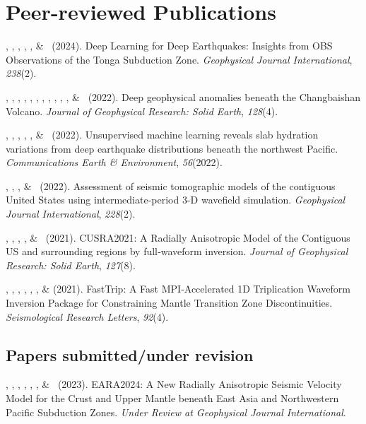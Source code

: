 \section{Peer-reviewed Publications}
\newcommand{\Revision}{\emph{under revision}}
\newcommand{\CS}{*} %
\newcommand{\CF}{\textsuperscript{\#}} %

\begin{etaremune}
\item \Me, \SWei, \WZhu, \GBeroza, \YJie, \& \NSaloor\ (2024).
    Deep Learning for Deep Earthquakes: Insights from OBS Observations of the Tonga Subduction Zone. 
    \emph{Geophysical Journal International}, \emph{238}(2). 
\item \SLi, \JLi, \TFerrand, \TZhou, \MLv, \Me, \RMaguire, \GHan, \JuanLi, \XBao, \YJiang, \& \TBao\ (2022).
    Deep geophysical anomalies beneath the Changbaishan Volcano.
    \emph{Journal of Geophysical Research: Solid Earth}, \emph{128}(4). 
\item \GMao, \TFerrand, \JLi, \BZhu, \Me, \& \MChen\ (2022).
Unsupervised machine learning reveals slab hydration variations from deep earthquake distributions beneath the northwest Pacific.
    \emph{Communications Earth \& Environment}, \emph{56}(2022). 
\item \TZhou, \Me, \JLi, \& \MChen\ (2022).
Assessment of seismic tomographic models of the contiguous United States using intermediate-period 3-D wavefield simulation.
    \emph{Geophysical Journal International}, \emph{228}(2). 
\item \TZhou, \JLi, \Me, \GLi, \& \MChen\ (2021).
CUSRA2021: A Radially Anisotropic Model of the Contiguous US and surrounding regions by full‐waveform inversion.
    \emph{Journal of Geophysical Research: Solid Earth}, \emph{127}(8). 
\item \JLi, \MChen, \KKoper, \TZhou, \Me, \SLi, \& \GLi (2021).
FastTrip: A Fast MPI‐Accelerated 1D Triplication Waveform Inversion Package for Constraining Mantle Transition Zone Discontinuities.
    \emph{Seismological Research Letters}, \emph{92}(4). 
\end{etaremune}

\subsection*{Papers submitted/under revision}
\begin{etaremune}
\item \Me, \MChen, \SWei, \JLi, \TZhou, \BWang, \& \YKim\ (2023).
    EARA2024: A New Radially Anisotropic Seismic Velocity Model for the Crust and Upper Mantle beneath East Asia and Northwestern Pacific Subduction Zones.
    \emph{Under Review at Geophysical Journal International}. 
\end{etaremune}
